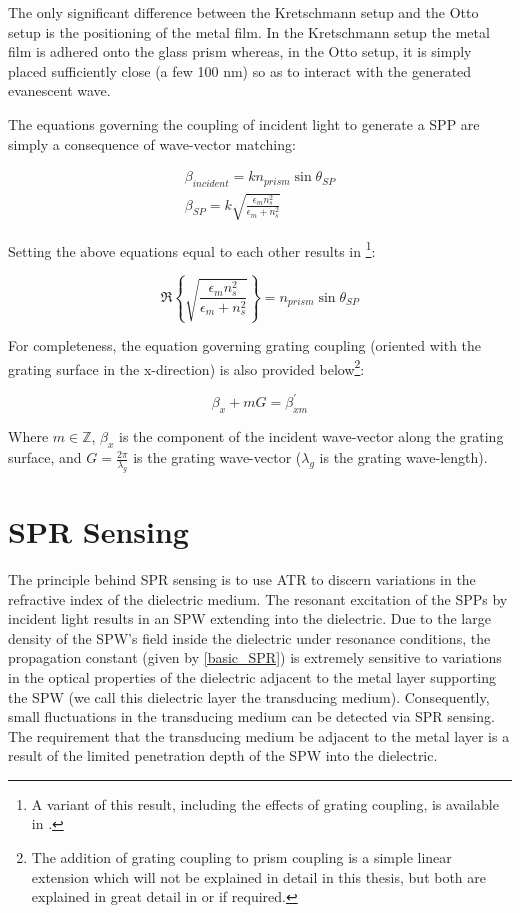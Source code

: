 The only significant difference between the Kretschmann setup and the Otto setup is the positioning of the metal film. In the Kretschmann setup the metal film is adhered onto the glass prism whereas, in the Otto setup, it is simply placed sufficiently close (a few 100 nm) so as to interact with the generated evanescent wave. 

The equations governing the coupling of incident light to generate a SPP are simply a consequence of wave-vector matching:

\begin{eqnarray} \label{mom_match}
\beta_{incident} = k n_{prism} \sin \theta_{SP} \\
\beta_{SP} = k \sqrt{\frac{\epsilon_m n_s^2}{\epsilon_m + n_s^2}}
\end{eqnarray}

Setting the above equations equal to each other results in \footnote{A variant of this result, including the effects of grating coupling, is available in \cite{farshid_ol}.}:

\begin{equation}\label{final_mom_eq}
\Re\left\lbrace\sqrt{\frac{\epsilon_m n_s^2}{\epsilon_m + n_s^2}}\right\rbrace = n_{prism} \sin \theta_{SP}
\end{equation}

For completeness, the equation governing grating coupling (oriented with the grating surface in the x-direction) is also provided below\footnote{The addition of grating coupling to prism coupling is a simple linear extension which will not be explained in detail in this thesis, but both are explained in great detail in \cite{complete_sp_coupling} or \cite{sp_coupling_2} if required.}:

\begin{equation}\label{grating_coupling}
\beta_x +mG = \beta^{'}_{xm}
\end{equation}

Where $m \in \mathbb{Z}$, $\beta_x$ is the component of the incident wave-vector along the grating surface, and $G = \frac{2\pi}{\lambda_g}$ is the grating wave-vector ($\lambda_g$ is the grating wave-length).

\section{SPR Sensing}

The principle behind SPR sensing is to use ATR to discern variations in the refractive index of the dielectric medium. The resonant excitation of the SPPs by incident light results in an SPW extending into the dielectric. Due to the large density of the SPW's field inside the dielectric under resonance conditions, the propagation constant (given by \autoref{basic_SPR}) is extremely sensitive to variations in the optical properties of the dielectric adjacent to the metal layer supporting the SPW (we call this dielectric layer the transducing medium). Consequently, small fluctuations in the transducing medium can be detected via SPR sensing. The requirement that the transducing medium be adjacent to the metal layer is a result of the limited penetration depth of the SPW into the dielectric.

